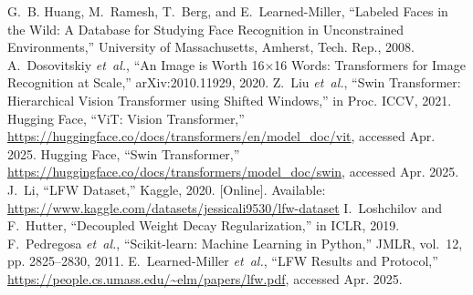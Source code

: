 \documentclass[twocolumn]{IEEEtran}
\begin{document}

\begin{thebibliography}{10}
 G.~B. Huang, M.~Ramesh, T.~Berg, and E.~Learned-Miller, “Labeled Faces in the Wild: A Database for Studying Face Recognition in Unconstrained Environments,” University of Massachusetts, Amherst, Tech. Rep., 2008.
 A.~Dosovitskiy \emph{et~al.}, “An Image is Worth 16×16 Words: Transformers for Image Recognition at Scale,” arXiv:2010.11929, 2020.
 Z.~Liu \emph{et~al.}, “Swin Transformer: Hierarchical Vision Transformer using Shifted Windows,” in Proc. ICCV, 2021.
 Hugging Face, “ViT: Vision Transformer,” \url{https://huggingface.co/docs/transformers/en/model_doc/vit}, accessed Apr. 2025.
 Hugging Face, “Swin Transformer,” \url{https://huggingface.co/docs/transformers/model_doc/swin}, accessed Apr. 2025.
 J.~Li, “LFW Dataset,” Kaggle, 2020. [Online]. Available: \url{https://www.kaggle.com/datasets/jessicali9530/lfw-dataset}
 I.~Loshchilov and F.~Hutter, “Decoupled Weight Decay Regularization,” in ICLR, 2019.
 F.~Pedregosa \emph{et~al.}, “Scikit-learn: Machine Learning in Python,” JMLR, vol.~12, pp. 2825–2830, 2011.
 E.~Learned-Miller \emph{et~al.}, “LFW Results and Protocol,” \url{https://people.cs.umass.edu/~elm/papers/lfw.pdf}, accessed Apr. 2025.
\end{thebibliography}
\end{document}

